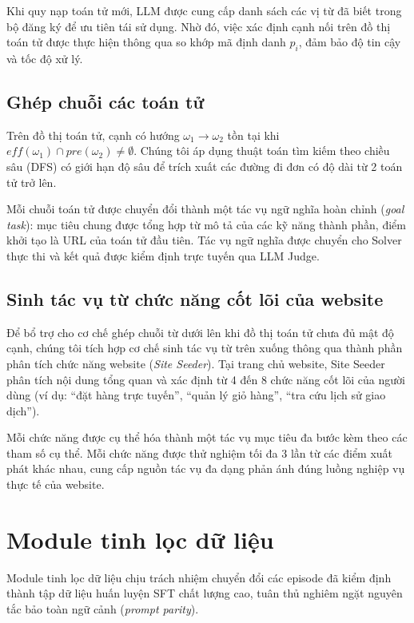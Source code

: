 Khi quy nạp toán tử mới, LLM được cung cấp danh sách các vị từ đã biết trong bộ đăng ký để ưu tiên tái sử dụng. Nhờ đó, việc xác định cạnh nối trên đồ thị toán tử được thực hiện thông qua so khớp mã định danh $p_i$, đảm bảo độ tin cậy và tốc độ xử lý.

\subsection{Ghép chuỗi các toán tử}

Trên đồ thị toán tử, cạnh có hướng $\omega_1 \rightarrow \omega_2$ tồn tại khi $\mathit{eff}(\omega_1) \cap \mathit{pre}(\omega_2) \neq \emptyset$. Chúng tôi áp dụng thuật toán tìm kiếm theo chiều sâu (DFS) có giới hạn độ sâu để trích xuất các đường đi đơn có độ dài từ 2 toán tử trở lên.

Mỗi chuỗi toán tử được chuyển đổi thành một tác vụ ngữ nghĩa hoàn chỉnh (\textit{goal task}): mục tiêu chung được tổng hợp từ mô tả của các kỹ năng thành phần, điểm khởi tạo là URL của toán tử đầu tiên. Tác vụ ngữ nghĩa được chuyển cho Solver thực thi và kết quả được kiểm định trực tuyến qua LLM Judge.

\subsection{Sinh tác vụ từ chức năng cốt lõi của website}
\label{sec:method-seed}

Để bổ trợ cho cơ chế ghép chuỗi từ dưới lên khi đồ thị toán tử chưa đủ mật độ cạnh, chúng tôi tích hợp cơ chế sinh tác vụ từ trên xuống thông qua thành phần phân tích chức năng website (\textit{Site Seeder}). Tại trang chủ website, Site Seeder phân tích nội dung tổng quan và xác định từ 4 đến 8 chức năng cốt lõi của người dùng (ví dụ: ``đặt hàng trực tuyến'', ``quản lý giỏ hàng'', ``tra cứu lịch sử giao dịch'').

Mỗi chức năng được cụ thể hóa thành một tác vụ mục tiêu đa bước kèm theo các tham số cụ thể. Mỗi chức năng được thử nghiệm tối đa 3 lần từ các điểm xuất phát khác nhau, cung cấp nguồn tác vụ đa dạng phản ánh đúng luồng nghiệp vụ thực tế của website.

\section{Module tinh lọc dữ liệu}
\label{sec:method-data}

Module tinh lọc dữ liệu chịu trách nhiệm chuyển đổi các episode đã kiểm định thành tập dữ liệu huấn luyện SFT chất lượng cao, tuân thủ nghiêm ngặt nguyên tắc bảo toàn ngữ cảnh (\textit{prompt parity}).

